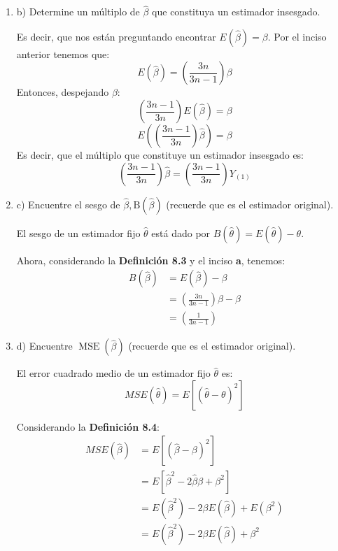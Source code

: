 \begin{enumerate}
\begin{proof}
    Ahora, volvemos a la expresión original $Y_{(1)}=\hat{\beta}$. Usando el \textbf{Cuadro de la Definición 8.2}, concluimos que $E(\hat{\beta})\neq 0$. Por lo tanto es un estimador sesgado. 
    \end{proof}.
\item b) Determine un múltiplo de $\hat{\beta}$ que constituya un estimador insesgado.
\begin{solution}
    Es decir, que nos están preguntando encontrar $E(\hat{\beta})=\beta $. Por el inciso anterior tenemos que:
    $$E(\hat{\beta})= \left(\frac{3n}{3n-1}\right)\beta$$
    Entonces, despejando $\beta$: 
    $$\left(\frac{3n-1}{3n}\right)E(\hat{\beta})= \beta$$
    $$E\left(\left(\frac{3n-1}{3n}\right)\hat{\beta}\right)= \beta$$
    Es decir, que el múltiplo que constituye un estimador insesgado es: 
    $$\left(\frac{3n-1}{3n}\right)\hat{\beta} = \left(\frac{3n-1}{3n}\right)Y_{(1)}$$
    \end{solution}
\item c) Encuentre el sesgo de $\hat{\beta}, \mathrm{B}(\hat{\beta})$ (recuerde que es el estimador original).
\begin{tcolorbox}[colback=gray!15,colframe=blue!1!blue,title=Definición 8.3]
    El sesgo de un estimador fijo $\hat{\theta}$ está dado por $B(\hat{\theta})=E(\hat{\theta})-\theta$.
    \end{tcolorbox}
\begin{solution}
    Ahora, considerando la \textbf{Definición 8.3} y el inciso \textbf{a}, tenemos: 
    \begin{align*}
        B(\hat{\beta})&=E(\hat{\beta})-\beta\\
                       &= \left(\frac{3n}{3n-1}\right)\beta - \beta \\
                       &= \left(\frac{1}{3n-1}\right)
    \end{align*}
    \end{solution}
\item d) Encuentre $\operatorname{MSE}(\hat{\beta})$ (recuerde que es el estimador original).
\begin{tcolorbox}[colback=gray!15,colframe=blue!1!blue,title=Definición 8.4]
    El error cuadrado medio de un estimador fijo $\hat{\theta}$ es: 
    $$MSE(\hat{\theta})=E[(\hat{\theta}-\theta)^2]$$
    \end{tcolorbox}
\begin{solution}
Considerando la \textbf{Definición 8.4}:
    \begin{align*}
        MSE(\hat{\beta})&=E[(\hat{\beta}-\beta)^2]\\
                        &= E[\hat{\beta}^2-2\hat{\beta}\beta +\beta^2]\\
                        &= E(\hat{\beta}^2)-2\beta E(\hat{\beta})+ E(\beta^2)\\
                        &= E(\hat{\beta}^2)-2\beta E(\hat{\beta})+ \beta^2
    \end{align*}
    

\end{solution}
\end{enumerate}
